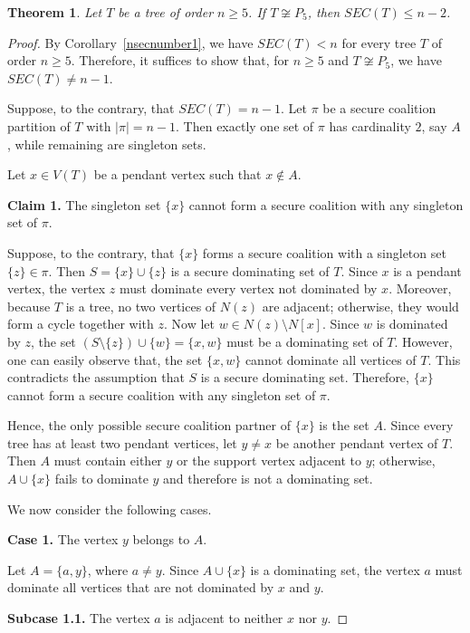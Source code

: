 \documentclass[10pt,a4paper]{amsart}
\newtheorem{theorem}{Theorem}
\begin{document}
\begin{theorem}\label{treen-2}
Let $T$ be a tree of order $n\ge 5$. If $T\not\cong P_5$, then
$SEC(T)\le n-2$.
\end{theorem}

\begin{proof}
By Corollary~\ref{nsecnumber1}, we have $SEC(T)<n$ for every tree $T$ of order $n\ge 5$. Therefore, it suffices to show that, for $n\ge 5$ and $T\not\cong P_5$, we have $SEC(T)\neq n-1$.

Suppose, to the contrary, that $SEC(T)=n-1$. Let $\pi$ be a secure coalition partition of $T$ with $|\pi|=n-1$. Then exactly one set of $\pi$ has cardinality $2$, say $A$, while remaining are singleton sets.

Let $x\in V(T)$ be a pendant vertex such that $x\notin A$.

\textbf{Claim 1.} The singleton set $\{x\}$ cannot form a secure coalition with any singleton set of $\pi$.

Suppose, to the contrary, that $\{x\}$ forms a secure coalition with a singleton set $\{z\}\in\pi$. Then $S=\{x\}\cup\{z\}$
is a secure dominating set of $T$. Since $x$ is a pendant vertex, the vertex $z$ must dominate every vertex not dominated by $x$. Moreover, because $T$ is a tree, no two vertices of $N(z)$ are adjacent; otherwise, they would form a cycle together with $z$.
Now let $w\in N(z)\setminus N[x]$. Since $w$ is dominated by $z$, the set $(S\setminus\{z\})\cup\{w\} =\{x,w\}$
must be a dominating set of $T$. However, one can easily observe that, the set $\{x,w\}$ cannot dominate all vertices of $T$. This contradicts the assumption that $S$ is a secure dominating set. Therefore, $\{x\}$ cannot form a secure coalition with any singleton set of $\pi$.

Hence, the only possible secure coalition partner of $\{x\}$ is the set $A$. Since every tree has at least two pendant vertices, let $y\neq x$ be another pendant vertex of $T$. Then $A$ must contain either $y$ or the support vertex adjacent to $y$; otherwise, $A\cup\{x\}$ fails to dominate $y$ and therefore is not a dominating set.

We now consider the following cases.

\textbf{Case 1.} The vertex $y$ belongs to $A$.

Let $A=\{a,y\}$, where $a\neq y$. Since $A\cup\{x\}$ is a dominating set, the vertex $a$ must dominate all vertices that are not dominated by $x$ and $y$.

\textbf{Subcase 1.1.} The vertex $a$ is adjacent to neither $x$ nor $y$.


\end{proof}
\end{document}
